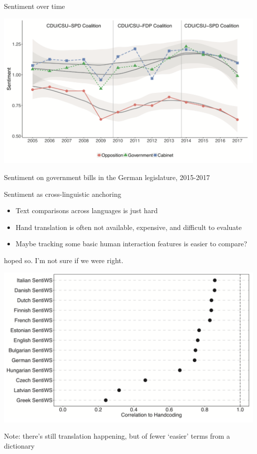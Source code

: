 \documentclass{hertieteaching}
\begin{document}
\begin{frame}{Sentiment over time}

\centerline{\includegraphics[scale=0.5]{pictures/multilingual-sent-de}}

Sentiment on government bills in the German legislature, 2015-2017 \parencite{Proksch.etal2019}

\end{frame}
\begin{frame}{Sentiment as cross-linguistic anchoring}

\begin{itemize}
  \item Text comparisons across languages is just hard
  \item Hand translation is often not available, expensive, and difficult to evaluate
  \item Maybe tracking some basic human interaction features is easier to compare?
\end{itemize}
\textcite{Proksch.etal2019} hoped so. I'm not sure if we were right.

\bigskip
\centerline{\includegraphics[scale=0.3]{pictures/multilingual-sent-comp}}

Note: there's still translation happening, but of fewer `easier' terms from a dictionary
\end{frame}
\end{document}
